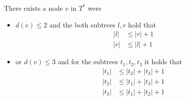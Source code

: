 \documentclass[11pt,a4paper,ngerman]{article}
\begin{document}
\begin{claim}\label{alge:ueb3:centerpoint}
There exists a node $v$ in $T^*$ were
\begin{itemize}
    \item $d(v) \leq 2$ and the both subtrees $l, r$ hold that
        \begin{equation}\begin{split}
            |l| &\leq |r| + 1\\
            |r| &\leq |l| + 1
        \end{split}\end{equation}
    \item or $d(v) \leq 3$ and for the subtrees $t_1, t_2, t_3$ it holds that
        \begin{equation}\begin{split}
            |t_1| &\leq |t_2| + |t_3| + 1\\
            |t_2| &\leq |t_1| + |t_3| + 1\\
            |t_3| &\leq |t_1| + |t_2| + 1
        \end{split}\end{equation}
\end{itemize}
\end{claim}



\label{LastPage}
\end{document}
